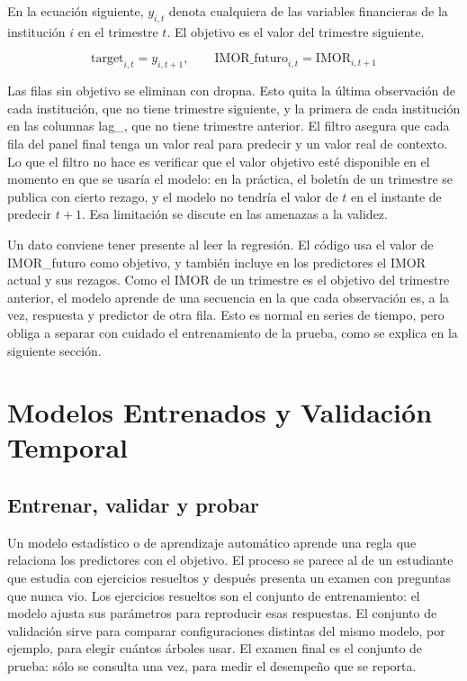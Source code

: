 En la ecuación siguiente, $y_{i,t}$ denota cualquiera de las variables financieras de la institución $i$ en el trimestre $t$. El objetivo es el valor del trimestre siguiente.

\begin{equation}
\label{eq:met_objetivo}
\text{target}_{i,t} = y_{i,t+1}, \qquad \text{IMOR\_futuro}_{i,t} = \text{IMOR}_{i,t+1}
\end{equation}

Las filas sin objetivo se eliminan con dropna. Esto quita la última observación de cada institución, que no tiene trimestre siguiente, y la primera de cada institución en las columnas lag\_, que no tiene trimestre anterior. El filtro asegura que cada fila del panel final tenga un valor real para predecir y un valor real de contexto. Lo que el filtro no hace es verificar que el valor objetivo esté disponible en el momento en que se usaría el modelo: en la práctica, el boletín de un trimestre se publica con cierto rezago, y el modelo no tendría el valor de $t$ en el instante de predecir $t+1$. Esa limitación se discute en las amenazas a la validez.

Un dato conviene tener presente al leer la regresión. El código usa el valor de IMOR\_futuro como objetivo, y también incluye en los predictores el IMOR actual y sus rezagos. Como el IMOR de un trimestre es el objetivo del trimestre anterior, el modelo aprende de una secuencia en la que cada observación es, a la vez, respuesta y predictor de otra fila. Esto es normal en series de tiempo, pero obliga a separar con cuidado el entrenamiento de la prueba, como se explica en la siguiente sección.

\section{Modelos Entrenados y Validación Temporal}

\subsection{Entrenar, validar y probar}
Un modelo estadístico o de aprendizaje automático aprende una regla que relaciona los predictores con el objetivo. El proceso se parece al de un estudiante que estudia con ejercicios resueltos y después presenta un examen con preguntas que nunca vio. Los ejercicios resueltos son el conjunto de entrenamiento: el modelo ajusta sus parámetros para reproducir esas respuestas. El conjunto de validación sirve para comparar configuraciones distintas del mismo modelo, por ejemplo, para elegir cuántos árboles usar. El examen final es el conjunto de prueba: sólo se consulta una vez, para medir el desempeño que se reporta.

